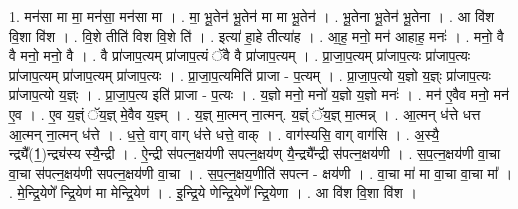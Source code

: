 \documentclass[17pt]{extarticle}
\begin{document}
1. मन॑सा मा मा॒ मन॑सा॒ मन॑सा मा । . मा॒ भू॒तेन॑ भू॒तेन॑ मा मा भू॒तेन॑ । . भू॒तेना भू॒तेन॑ भू॒तेना । . आ वि॑श वि॒शा वि॑श । . वि॒शे तीति॑ विश वि॒शे ति॑ । . इत्या॑ हा॒हे तीत्या॑ह । . आ॒ह॒ मनो॒ मन॑ आहाह॒ मनः॑ । . मनो॒ वै वै मनो॒ मनो॒ वै । . वै प्रा॑जाप॒त्यम् प्रा॑जाप॒त्यं ॅवै वै प्रा॑जाप॒त्यम् । . प्रा॒जा॒प॒त्यम् प्रा॑जाप॒त्यः प्रा॑जाप॒त्यः प्रा॑जाप॒त्यम् प्रा॑जाप॒त्यम् प्रा॑जाप॒त्यः । . प्रा॒जा॒प॒त्यमिति॑ प्राजा - प॒त्यम् । . प्रा॒जा॒प॒त्यो य॒ज्ञो य॒ज्ञ्ः प्रा॑जाप॒त्यः प्रा॑जाप॒त्यो य॒ज्ञ्ः । . प्रा॒जा॒प॒त्य इति॑ प्राजा - प॒त्यः । . य॒ज्ञो मनो॒ मनो॑ य॒ज्ञो य॒ज्ञो मनः॑ । . मन॑ ए॒वैव मनो॒ मन॑ ए॒व । . ए॒व य॒ज्ञ्ं ॅय॒ज्ञ् मे॒वैव य॒ज्ञ्म् । . य॒ज्ञ् मा॒त्मन् ना॒त्मन्. य॒ज्ञ्ं ॅय॒ज्ञ् मा॒त्मन्न् । . आ॒त्मन् ध॑त्ते धत्त आ॒त्मन् ना॒त्मन् ध॑त्ते । . ध॒त्ते॒ वाग् वाग् ध॑त्ते धत्ते॒ वाक् । . वाग॑स्यसि॒ वाग् वाग॑सि । . अ॒स्यै॒ न्द्र्यै᳚(1॒)न्द्र्य॑स्य स्यै॒न्द्री । . ऐ॒न्द्री स॑पत्न॒क्षय॑णी सपत्न॒क्षय॑ण् यै॒न्द्र्यै᳚न्द्री स॑पत्न॒क्षय॑णी । . स॒प॒त्न॒क्षय॑णी वा॒चा वा॒चा स॑पत्न॒क्षय॑णी सपत्न॒क्षय॑णी वा॒चा । . स॒प॒त्न॒क्षय॒णीति॑ सपत्न - क्षय॑णी । . वा॒चा मा॑ मा वा॒चा वा॒चा मा᳚ । . मे॒न्द्रि॒येणे᳚ न्द्रि॒येण॑ मा मेन्द्रि॒येण॑ । . इ॒न्द्रि॒ये णेन्द्रि॒येणे᳚ न्द्रि॒येणा । . आ वि॑श वि॒शा वि॑श । \newline
\end{document}
